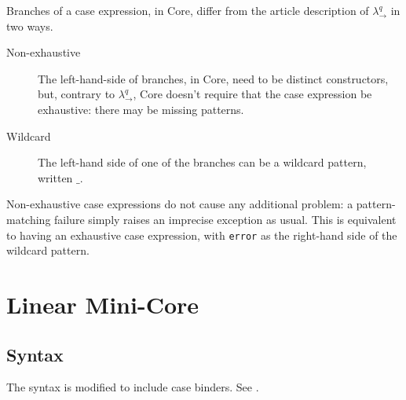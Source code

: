 \documentclass{article}
\newcommand{\wildcard}{\_}
\newcommand\calc{{\ensuremath{λ^q_{→}}}}
\begin{document}
Branches of a case expression, in Core, differ from the article
description of \calc{} in two ways.
\begin{description}
\item[Non-exhaustive] The left-hand-side of branches, in Core, need to be
  distinct constructors, but, contrary to \calc{}, Core doesn't
  require that the case expression be exhaustive: there may be missing
  patterns.
\item[Wildcard] The left-hand side of one of the branches can be a
  wildcard pattern, written $\wildcard$.
\end{description}

Non-exhaustive case expressions do not cause any additional problem:
a pattern-matching failure simply raises an imprecise exception as
usual. This is equivalent to having an exhaustive case expression, with
\verb+error+ as the right-hand side of the wildcard pattern.

\section{Linear Mini-Core}

\subsection{Syntax}
\newcommand{\pip}{\kern 1.18em || }
\label{sec:syntax}

The syntax is modified to include case binders. See
.
\end{document}
